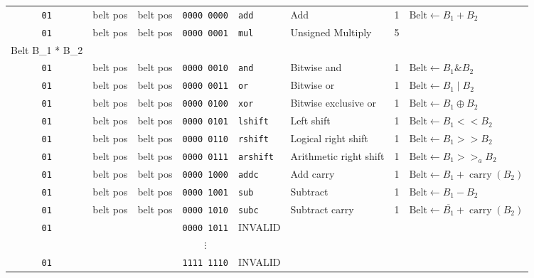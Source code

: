 \documentclass{article}
\begin{document}
\begin{landscape}
\begin{longtable}{c c c c l l c l}
		\texttt{01} & belt pos & belt pos & \texttt{0000 0000} & \texttt{add}     & Add                    & 1 &
			\(\textrm{Belt} \gets B_1 + B_2\) \\
		\texttt{01} & belt pos & belt pos & \texttt{0000 0001} & \texttt{mul}     & Unsigned Multiply      & 5 &
			\(\begin{array}{l}
				\textrm{Belt} \gets \left(B_1 * B_2\right) << 16, \\
				\textrm{Belt} \gets B_1 * B_2
			\end{array}\) \\
		\texttt{01} & belt pos & belt pos & \texttt{0000 0010} & \texttt{and}     & Bitwise and            & 1 &
			\(\textrm{Belt} \gets B_1 \mathop{\&} B_2\) \\
		\texttt{01} & belt pos & belt pos & \texttt{0000 0011} & \texttt{or}      & Bitwise or             & 1 &
			\(\textrm{Belt} \gets B_1 \mathop{|} B_2\) \\
		\texttt{01} & belt pos & belt pos & \texttt{0000 0100} & \texttt{xor}     & Bitwise exclusive or   & 1 &
			\(\textrm{Belt} \gets B_1 \oplus B_2\) \\
		\texttt{01} & belt pos & belt pos & \texttt{0000 0101} & \texttt{lshift}  & Left shift             & 1 &
			\(\textrm{Belt} \gets B_1 << B_2\) \\
		\texttt{01} & belt pos & belt pos & \texttt{0000 0110} & \texttt{rshift}  & Logical right shift    & 1 &
			\(\textrm{Belt} \gets B_1 >> B_2\) \\
		\texttt{01} & belt pos & belt pos & \texttt{0000 0111} & \texttt{arshift} & Arithmetic right shift & 1 &
			\(\textrm{Belt} \gets B_1 >>_a B_2\) \\
		\texttt{01} & belt pos & belt pos & \texttt{0000 1000} & \texttt{addc}    & Add carry              & 1 &
			\(\textrm{Belt} \gets B_1 + \operatorname{carry}\left(B_2\right)\) \\
		\texttt{01} & belt pos & belt pos & \texttt{0000 1001} & \texttt{sub}     & Subtract               & 1 &
			\(\textrm{Belt} \gets B_1 - B_2\) \\
		\texttt{01} & belt pos & belt pos & \texttt{0000 1010} & \texttt{subc}    & Subtract carry         & 1 &
			\(\textrm{Belt} \gets \overline{B_1} + \operatorname{carry}\left(B_2\right)\) \\
		\texttt{01} & & & \texttt{0000 1011} & INVALID & & \\
								& & & \(\vdots\)         &         & & \\
		\texttt{01} & & & \texttt{1111 1110} & INVALID & & \\

\end{longtable}
\end{landscape}
\end{document}
